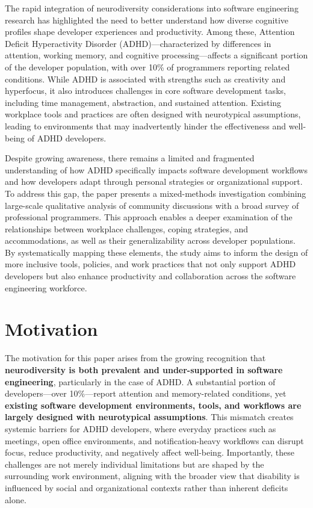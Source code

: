 The rapid integration of neurodiversity considerations into software engineering research has highlighted the need to better understand how diverse cognitive profiles shape developer experiences and productivity. Among these, Attention Deficit Hyperactivity Disorder (ADHD)—characterized by differences in attention, working memory, and cognitive processing—affects a significant portion of the developer population, with over 10\% of programmers reporting related conditions. While ADHD is associated with strengths such as creativity and hyperfocus, it also introduces challenges in core software development tasks, including time management, abstraction, and sustained attention. Existing workplace tools and practices are often designed with neurotypical assumptions, leading to environments that may inadvertently hinder the effectiveness and well-being of ADHD developers.

Despite growing awareness, there remains a limited and fragmented understanding of how ADHD specifically impacts software development workflows and how developers adapt through personal strategies or organizational support. To address this gap, the paper presents a mixed-methods investigation combining large-scale qualitative analysis of community discussions with a broad survey of professional programmers. This approach enables a deeper examination of the relationships between workplace challenges, coping strategies, and accommodations, as well as their generalizability across developer populations. By systematically mapping these elements, the study aims to inform the design of more inclusive tools, policies, and work practices that not only support ADHD developers but also enhance productivity and collaboration across the software engineering workforce.

\section{Motivation}
The motivation for this paper arises from the growing recognition that \textbf{neurodiversity is both prevalent and under-supported in software engineering}, particularly in the case of ADHD. A substantial portion of developers—over 10\%—report attention and memory-related conditions, yet \textbf{existing software development environments, tools, and workflows are largely designed with neurotypical assumptions}. This mismatch creates systemic barriers for ADHD developers, where everyday practices such as meetings, open office environments, and notification-heavy workflows can disrupt focus, reduce productivity, and negatively affect well-being. Importantly, these challenges are not merely individual limitations but are shaped by the surrounding work environment, aligning with the broader view that disability is influenced by social and organizational contexts rather than inherent deficits alone.

